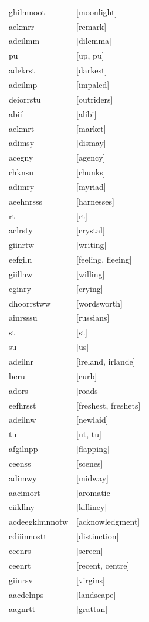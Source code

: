 \documentclass{article}
\begin{document}
\begin{tabular}{ll}
ghilmnoot & [moonlight] \\
aekmrr & [remark] \\
adeilmm & [dilemma] \\
pu & [up, pu] \\
adekrst & [darkest] \\
adeilmp & [impaled] \\
deiorrstu & [outriders] \\
abiil & [alibi] \\
aekmrt & [market] \\
adimsy & [dismay] \\
acegny & [agency] \\
chknsu & [chunks] \\
adimry & [myriad] \\
aeehnrsss & [harnesses] \\
rt & [rt] \\
aclrsty & [crystal] \\
giinrtw & [writing] \\
eefgiln & [feeling, fleeing] \\
giillnw & [willing] \\
cginry & [crying] \\
dhoorrstww & [wordsworth] \\
ainrsssu & [russians] \\
st & [st] \\
su & [us] \\
adeilnr & [ireland, irlande] \\
bcru & [curb] \\
adors & [roads] \\
eefhrsst & [freshest, freshets] \\
adeilnw & [newlaid] \\
tu & [ut, tu] \\
afgilnpp & [flapping] \\
ceenss & [scenes] \\
adimwy & [midway] \\
aacimort & [aromatic] \\
eiikllny & [killiney] \\
acdeegklmnnotw & [acknowledgment] \\
cdiiinnostt & [distinction] \\
ceenrs & [screen] \\
ceenrt & [recent, centre] \\
giinrsv & [virgins] \\
aacdelnps & [landscape] \\
aagnrtt & [grattan] \\

\end{tabular}
\end{document}
